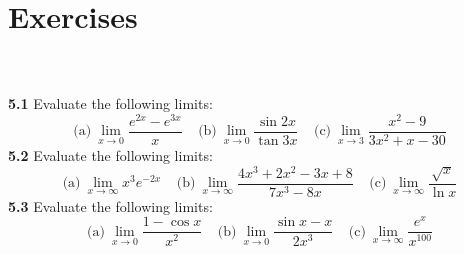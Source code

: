 \documentclass[11pt]{scrartcl}
\begin{document}
\section{Exercises}\\
\\
\noindent 
\textbf{5.1} Evaluate the following limits: 
$$\text{(a)} \ \lim_{x \to 0} \frac{e^{2x}-e^{3x}}{x} \ \ \ \ \ \text{(b)} \ \lim_{x \to 0} \frac{\sin 2x}{\tan 3x} \ \ \ \ \ \text{(c)} \ \lim_{x \to 3} \frac{x^2-9}{3x^2+x-30}$$
\noindent 
\textbf{5.2} Evaluate the following limits: $$\text{(a)} \ \lim_{x \to \infty} x^3e^{-2x} \ \ \ \ \ \text{(b)} \ \lim_{x \to \infty} \frac{4x^3+2x^2-3x+8}{7x^3-8x} \ \ \ \ \ \text{(c)} \ \lim_{x \to \infty} \frac{\sqrt{x}}{\ln x}$$
\noindent
\textbf{5.3} Evaluate the following limits: $$\text{(a)} \ \lim_{x \to 0} \frac{1- \cos x}{x^2} \ \ \ \ \ \text{(b)} \ \lim_{x \to 0} \frac{\sin x -x}{2x^3} \ \ \ \ \ \text{(c)} \ \lim_{x \to \infty} \frac{e^x}{x^{100}}$$
\end{document}
